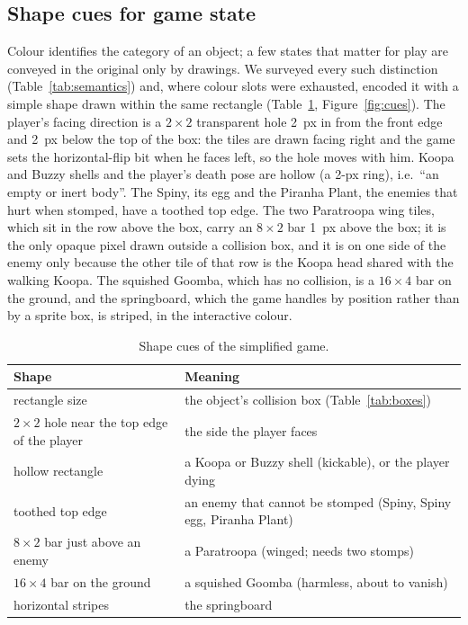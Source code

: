 \documentclass{article}
\begin{document}
\subsection{Shape cues for game state}
\label{sec:shapes}

Colour identifies the category of an object; a few states that matter for play are conveyed in
the original only by drawings. We surveyed every such distinction (Table~\ref{tab:semantics}) and,
where colour slots were exhausted, encoded it with a simple shape drawn within the same rectangle
(Table~\ref{tab:shapes}, Figure~\ref{fig:cues}). The player's facing direction is a $2\times2$
transparent hole 2~px in from the front edge and 2~px below the top of the box: the tiles are drawn
facing right and the game sets the horizontal-flip bit when he faces left, so the hole moves with
him. Koopa and Buzzy shells and the player's death pose are hollow (a 2-px ring), i.e.\ ``an empty
or inert body''. The Spiny, its egg and the Piranha Plant, the enemies that hurt when stomped, have
a toothed top edge. The two Paratroopa wing tiles, which sit in the row above the box, carry an
$8\times2$ bar 1~px above the box; it is the only opaque pixel drawn outside a collision box, and
it is on one side of the enemy only because the other tile of that row is the Koopa head shared
with the walking Koopa. The squished Goomba, which has no collision, is a $16\times4$ bar on the
ground, and the springboard, which the game handles by position rather than by a sprite box, is
striped, in the interactive colour.

\begin{table}[t]
  \caption{Shape cues of the simplified game.}
  \centering
  \small
  \begin{tabular}{lp{9.5cm}}
    \toprule
    Shape & Meaning \\
    \midrule
    rectangle size & the object's collision box (Table~\ref{tab:boxes}) \\
    $2\times2$ hole near the top edge of the player & the side the player faces \\
    hollow rectangle & a Koopa or Buzzy shell (kickable), or the player dying \\
    toothed top edge & an enemy that cannot be stomped (Spiny, Spiny egg, Piranha Plant) \\
    $8\times2$ bar just above an enemy & a Paratroopa (winged; needs two stomps) \\
    $16\times4$ bar on the ground & a squished Goomba (harmless, about to vanish) \\
    horizontal stripes & the springboard \\
    \bottomrule
  \end{tabular}
  \label{tab:shapes}
\end{table}
\end{document}
